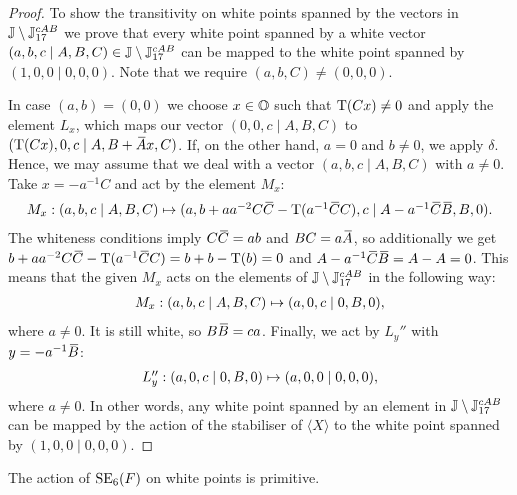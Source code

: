 \begin{proof}
	 To show the transitivity on white points spanned by the vectors in 
	 $\mathbb{J}\setminus \mathbb{J}_{17}^{cAB}$ we prove that every white point 
	 spanned by a white vector $(a,b,c\mid A,B,C)\in \mathbb{J}\setminus \mathbb{J}_{17}^{cAB}$ 
	 can be mapped to the white point spanned by $(1,0,0\mid 0,0,0)$. Note that
	 we require $(a,b,C) \neq (0,0,0)$. 
	 
	 In case $(a,b) = (0,0)$ we choose $x\in \mathbb{O}$ such that $\operatorname{T}(Cx) \neq 0$ and
	 apply the element $L_x$, which maps our vector $(0,0,c\mid A,B,C)$ to
	 $(\operatorname{T}(Cx),0,c\mid A,B+\mathord{\mbox{\hspace*{0pt}}\,\overline{\!A\!\!\;}\!\:}\mbox{\hspace*{0pt}} x,C)$. If, on the other hand, $a = 0$ and 
	 $b \neq 0$, we apply $\delta$. Hence, we may assume that we deal with a vector
	 $(a,b,c\mid A,B,C)$ with $a \neq 0$. Take $x = -a^{-1}C$ and act by the element
	 $M_x$: 
	 \begin{equation*}
	 	\begin{array}{r@{\;}c@{\;}l}
	 		M_x : (a,b,c\mid A,B,C) & \mapsto & 
	 				(a,b+ aa^{-2} C\ovC - \Tr(a^{-1}\ovC C),c \mid 
	 						A - a^{-1}\ovC \ovB, B, 0).
	 	\end{array}
	 \end{equation*}
	 The whiteness conditions imply $C\mathord{\mbox{\hspace*{0pt}}\,\overline{\!C\!\!\;}\!\:}\mbox{\hspace*{0pt}} = ab$ and $BC = a\mathord{\mbox{\hspace*{0pt}}\,\overline{\!A\!\!\;}\!\:}\mbox{\hspace*{0pt}}$, so additionally we get 
	 $b+ aa^{-2} C\ovC - \Tr(a^{-1}\ovC C) = b+b-\Tr(b) = 0$ and 
	 $A - a^{-1}\ovC \ovB = A - A = 0$. This means that the given $M_x$ acts on the elements
	 of $\mathbb{J}\setminus \mathbb{J}_{17}^{cAB}$ in the following way:
	 \begin{equation*}
	 	\begin{array}{r@{\;}c@{\;}l}
	 		M_x : (a,b,c\mid A,B,C) & \mapsto & 
	 				(a,0,c \mid 
	 						0, B, 0),
	 	\end{array}
	 \end{equation*}
	 where $a\neq 0$. It is still white, so $B\mathord{\mbox{\hspace*{0pt}}\,\overline{\!B\!\!\;}\!\:}\mbox{\hspace*{0pt}} = ca$.
	 Finally, we act by $L_y''$ with $y = -a^{-1}\mathord{\mbox{\hspace*{0pt}}\,\overline{\!B\!\!\;}\!\:}\mbox{\hspace*{0pt}}$:
	 \begin{equation*}
	 	\begin{array}{r@{\;}c@{\;}l}
	 		L_y'': (a,0,c\mid 0,B,0) & \mapsto & 
	 			(a,0,0 \mid 0,0,0), 
	 	\end{array}
	 \end{equation*}
	 where $a \neq 0$. In other words, any white point spanned by an element
	 in $\mathbb{J}\setminus\mathbb{J}_{17}^{cAB}$ can be mapped by the action of the stabiliser
	 of $\langle X\rangle$ to the white point spanned by $(1,0,0\mid 0,0,0)$. 
\end{proof}

\begin{lemma}
	\label{lemma:1_white_primitive}
	The action of $\mathrm{SE}_6(F)$ on white points is primitive.
\end{lemma}

